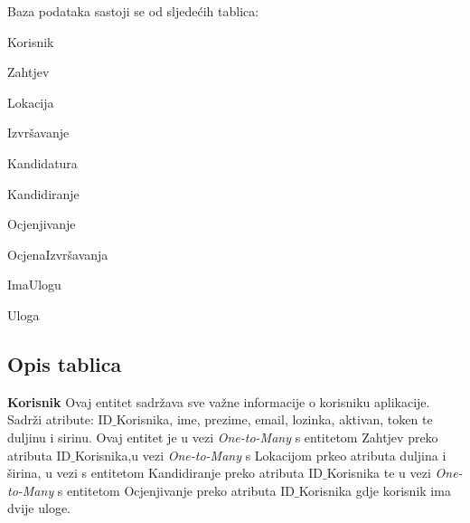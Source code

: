 		Baza podataka sastoji se od sljedećih tablica:
		
		\begin{packed_item}
			\item Korisnik
			\item Zahtjev
			\item Lokacija
			\item Izvršavanje
			\item Kandidatura
			\item Kandidiranje
			\item Ocjenjivanje
			\item OcjenaIzvršavanja
			\item ImaUlogu 
			\item Uloga
			
		\end{packed_item}
		
			\subsection{Opis tablica}
			
					    \textbf{ Korisnik}
		    \text Ovaj entitet sadržava sve važne informacije o korisniku aplikacije. Sadrži atribute: ID${\_}$Korisnika, ime, prezime, email, lozinka, aktivan, token te duljinu i sirinu. Ovaj entitet je u vezi \emph{One-to-Many} s entitetom Zahtjev preko atributa ID${\_}$Korisnika,u vezi  \emph{One-to-Many} s Lokacijom prkeo atributa duljina i širina, u vezi s entitetom Kandidiranje preko atributa ID${\_}$Korisnika te u vezi \emph{One-to-Many} s entitetom Ocjenjivanje preko atributa ID${\_}$Korisnika gdje korisnik ima dvije uloge. 
				
